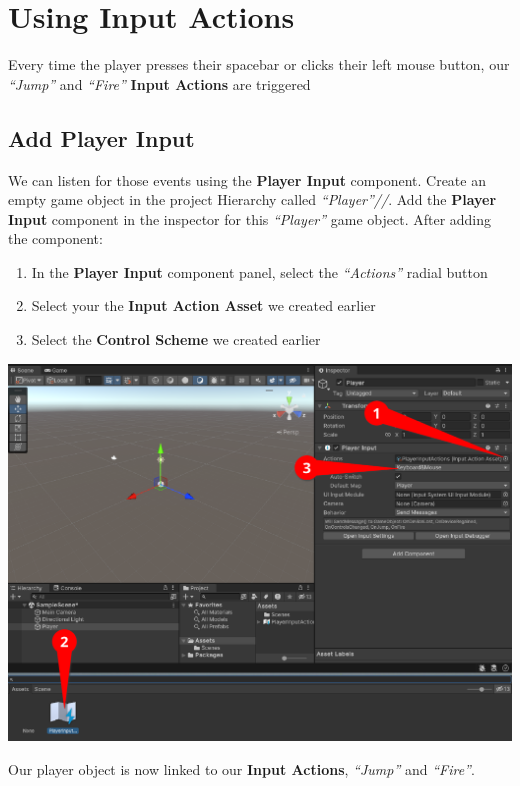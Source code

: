 \documentclass[a4paper,11pt,twoside]{article}
\begin{document}
\section*{Using Input Actions}
\label{sec:org47288e1}
Every time the player presses their spacebar or clicks their left mouse button, our \emph{``Jump''} and \emph{``Fire''} \textbf{Input Actions} are triggered
\subsection*{Add Player Input}
\label{sec:org2cd097f}
We can listen for those events using the \textbf{Player Input} component. Create an empty game object in the project Hierarchy called \emph{``Player''//}. Add the \textbf{Player Input} component in the inspector for this \emph{``Player''} game object.
After adding the component:
\begin{enumerate}
\item In the \textbf{Player Input} component panel, select the \emph{``Actions''} radial button
\item Select your the \textbf{Input Action Asset} we created earlier
\item Select the \textbf{Control Scheme} we created earlier
\end{enumerate}
\begin{center}
\includegraphics[width=.9\linewidth]{./SnapShots/AddPlayerInput.png}
\end{center}
Our player object is now linked to our \textbf{Input Actions}, \emph{``Jump''} and \emph{``Fire''}.
\end{document}
